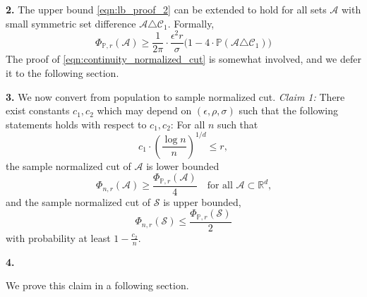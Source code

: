 \documentclass[11pt,twoside]{article}
\newcommand{\Reals}{\mathbb{R}}
\newcommand{\Rd}{\Reals^d}
\newcommand{\1}{\mathbf{1}}
\newcommand{\Pbb}{\mathbb{P}}
\newcommand{\Sset}{\mathcal{S}}
\newcommand{\Cset}{\mathcal{C}}
\newcommand{\Aset}{\mathcal{A}}
\begin{document}
\textbf{2.} The upper bound \eqref{eqn:lb_proof_2} can be extended to hold for all sets $\Aset$ with small symmetric set difference $\Aset \triangle \Cset_1$. Formally,
\begin{equation}
\label{eqn:continuity_normalized_cut}
\Phi_{\Pbb,r}(\Aset) \geq \frac{1}{2\pi} \cdot \frac{\epsilon^2r}{\sigma} \bigl(1 - 4 \cdot \Pbb(\Aset \triangle \Cset_1 )\bigr)
\end{equation}
The proof of \eqref{eqn:continuity_normalized_cut} is somewhat involved, and we defer it to the following section.

\textbf{3.} We now convert from population to sample normalized cut. \textit{Claim 1:} There exist constants $c_1,c_2$ which may depend on $(\epsilon, \rho, \sigma)$ such that the following statements holds with respect to $c_1,c_2$: For all $n$ such that
\begin{equation*}
c_1 \cdot \left(\frac{\log n}{n}\right)^{1/d} \leq r,
\end{equation*}
the sample normalized cut of $\Aset$ is lower bounded
\begin{equation*}
\Phi_{n,r}(\Aset) \geq \frac{\Phi_{\Pbb,r}(\Aset)}{4} \quad \textrm{for all $\Aset \subset \Rd$,}
\end{equation*}  
and the sample normalized cut of $\Sset$ is upper bounded,
\begin{equation*}
\Phi_{n,r}(\Sset) \leq \frac{\Phi_{\Pbb,r}(\Sset)}{2}
\end{equation*}
with probability at least $1 - \frac{c_2}{n}$. 

\textbf{4.}

We prove this claim in a following section.
\end{document}
